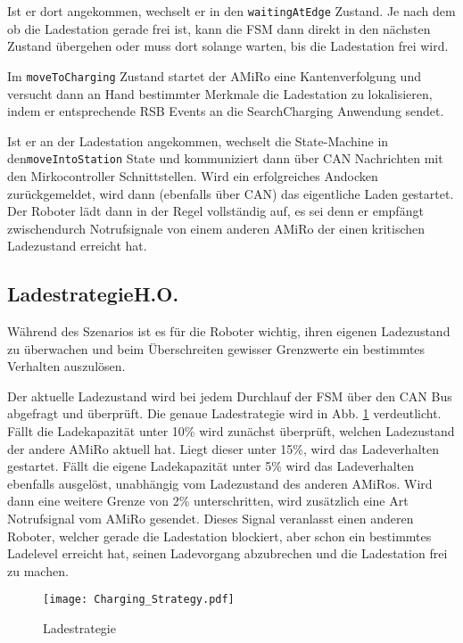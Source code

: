 Ist er dort angekommen, wechselt er in den \texttt{waitingAtEdge} Zustand. Je nach dem ob die Ladestation gerade frei ist, kann die FSM dann direkt in den nächsten Zustand übergehen oder muss dort solange warten, bis die Ladestation frei wird.

Im \texttt{moveToCharging} Zustand startet der AMiRo eine Kantenverfolgung und versucht dann an Hand bestimmter Merkmale die Ladestation zu lokalisieren, indem er entsprechende RSB Events an die SearchCharging Anwendung sendet.

Ist er an der Ladestation angekommen, wechselt die State-Machine in den\linebreak \texttt{moveIntoStation} State und kommuniziert dann über CAN Nachrichten mit den Mirkocontroller Schnittstellen. Wird ein erfolgreiches Andocken zurückgemeldet, wird dann (ebenfalls über CAN) das eigentliche Laden gestartet. Der Roboter lädt dann in der Regel vollständig auf, es sei denn er empfängt zwischendurch Notrufsignale von einem anderen AMiRo der einen kritischen Ladezustand erreicht hat. 

\subsection[Ladestrategie]{Ladestrategie\hfill {\normalsize H.O.}}
Während des Szenarios ist es für die Roboter wichtig, ihren eigenen Ladezustand zu überwachen und beim Überschreiten gewisser Grenzwerte ein bestimmtes Verhalten auszulösen.

Der aktuelle Ladezustand wird bei jedem Durchlauf der FSM über den CAN Bus abgefragt und überprüft. Die genaue Ladestrategie wird in Abb. \ref{fig:charging-strategy} verdeutlicht. Fällt die Ladekapazität unter 10\%  wird zunächst überprüft, welchen Ladezustand der andere AMiRo aktuell hat. Liegt dieser unter 15\%, wird das Ladeverhalten gestartet. Fällt die eigene Ladekapazität unter 5\% wird das Ladeverhalten ebenfalls ausgelöst, unabhängig vom Ladezustand des anderen AMiRos. Wird dann eine weitere Grenze von 2\% unterschritten, wird zusätzlich eine Art Notrufsignal vom AMiRo gesendet. Dieses Signal veranlasst einen anderen Roboter, welcher gerade die Ladestation blockiert, aber schon ein bestimmtes Ladelevel erreicht hat, seinen Ladevorgang abzubrechen und die Ladestation frei zu machen.

\begin{figure}[h]
	\begin{center}
		\texttt{[image: Charging\_Strategy.pdf]} 	
		\caption{Ladestrategie}
		\label{fig:charging-strategy}
	\end{center}
\end{figure}

